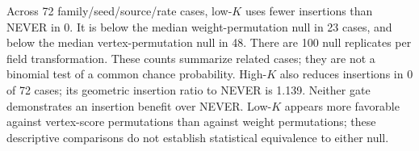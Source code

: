 Across 72 family/seed/source/rate cases, low-$K$ uses fewer insertions than NEVER in 0. It is below the median weight-permutation null in 23 cases, and below the median vertex-permutation null in 48. There are 100 null replicates per field transformation. These counts summarize related cases; they are not a binomial test of a common chance probability.
High-$K$ also reduces insertions in 0 of 72 cases; its geometric insertion ratio to NEVER is 1.139. Neither gate demonstrates an insertion benefit over NEVER. Low-$K$ appears more favorable against vertex-score permutations than against weight permutations; these descriptive comparisons do not establish statistical equivalence to either null.
